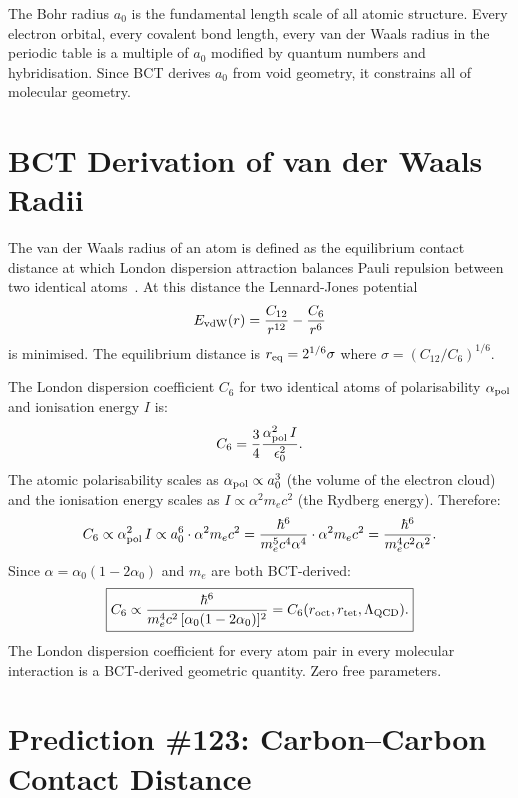 \documentclass[aps,prl,preprint,superscriptaddress,floatfix]{revtex4-2}
\begin{document}
The Bohr radius $a_0$ is the fundamental length scale of all
atomic structure. Every electron orbital, every covalent bond length,
every van der Waals radius in the periodic table is a multiple of $a_0$
modified by quantum numbers and hybridisation. Since BCT derives $a_0$
from void geometry, it constrains all of molecular geometry.

\section{BCT Derivation of van der Waals Radii}

The van der Waals radius of an atom is defined as the equilibrium
contact distance at which London dispersion attraction balances
Pauli repulsion between two identical atoms~\cite{bondi1964}. At this
distance the Lennard-Jones potential
\begin{equation}
E_{\rm vdW}(r) = \frac{C_{12}}{r^{12}} - \frac{C_6}{r^6}
\end{equation}
is minimised. The equilibrium distance is $r_{\rm eq} = 2^{1/6}\sigma$
where $\sigma = (C_{12}/C_6)^{1/6}$.

The London dispersion coefficient $C_6$ for two identical atoms of
polarisability $\alpha_{\rm pol}$ and ionisation energy $I$ is:
\begin{equation}
C_6 = \frac{3}{4}\frac{\alpha_{\rm pol}^2\,I}{\epsilon_0^2}.
\end{equation}
The atomic polarisability scales as $\alpha_{\rm pol} \propto a_0^3$
(the volume of the electron cloud) and the ionisation energy scales as
$I \propto \alpha^2 m_e c^2$ (the Rydberg energy). Therefore:
\begin{equation}
C_6 \propto \alpha_{\rm pol}^2\,I \propto a_0^6 \cdot \alpha^2 m_e c^2
= \frac{\hbar^6}{m_e^5 c^4 \alpha^4} \cdot \alpha^2 m_e c^2
= \frac{\hbar^6}{m_e^4 c^2 \alpha^2}.
\end{equation}
Since $\alpha = \alpha_0(1-2\alpha_0)$ and $m_e$ are both BCT-derived:
\begin{equation}
\boxed{C_6 \propto \frac{\hbar^6}{m_e^4 c^2\,[\alpha_0(1-2\alpha_0)]^2}
= C_6(r_{\rm oct}, r_{\rm tet}, \Lambda_{\rm QCD}).}
\end{equation}
The London dispersion coefficient for every atom pair in every molecular
interaction is a BCT-derived geometric quantity. Zero free parameters.

\section{Prediction \#123: Carbon--Carbon Contact Distance}
\end{document}
